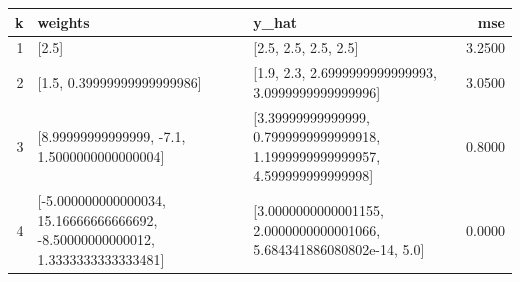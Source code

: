 \begin{tabular}{rllr}
\toprule
k & weights & y_hat & mse \\
\midrule
1 & [2.5] & [2.5, 2.5, 2.5, 2.5] & 3.2500 \\
2 & [1.5, 0.39999999999999986] & [1.9, 2.3, 2.6999999999999993, 3.0999999999999996] & 3.0500 \\
3 & [8.99999999999999, -7.1, 1.5000000000000004] & [3.39999999999999, 0.7999999999999918, 1.1999999999999957, 4.599999999999998] & 0.8000 \\
4 & [-5.000000000000034, 15.16666666666692, -8.50000000000012, 1.3333333333333481] & [3.0000000000001155, 2.0000000000001066, 5.684341886080802e-14, 5.0] & 0.0000 \\
\bottomrule
\end{tabular}
